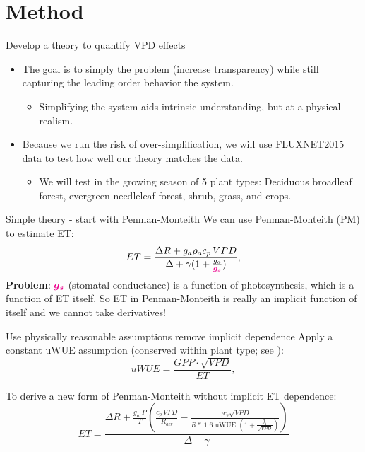 \documentclass[aspectratio=169]{beamer}
\begin{document}
\section{Method}
\begin{frame}{Develop a theory to quantify VPD effects}
  \begin{itemize}
  \item The goal is to simply the problem (increase transparency) while still capturing the leading order behavior the system.
    \begin{itemize}
    \item Simplifying the system aids intrinsic understanding, but at a physical realism.
    \end{itemize}
  \item Because we run the risk of over-simplification, we will use FLUXNET2015 data to test how well our theory matches the data.
    \begin{itemize}
    \item We will test in the growing season of 5 plant types: Deciduous broadleaf forest, evergreen needleleaf forest, shrub, grass, and crops.
    \end{itemize}
  \end{itemize}
\end{frame}

\begin{frame}{Simple theory - start with Penman-Monteith}
  We can use Penman-Monteith (PM) to estimate ET:
  \[ET = \frac{\Delta R + g_a \rho_a c_p \, VPD}{\Delta + \gamma(1 + \frac{g_a}{\textcolor{magenta}{\boldsymbol{g_s}}})},\]
    \textbf{Problem}: \Large $\textcolor{magenta}{\boldsymbol{g_s}}$ \normalsize (stomatal conductance) is a function of photosynthesis, which is a function of ET itself.  So ET in Penman-Monteith is really an implicit function of itself and we cannot take derivatives!
\end{frame}

\begin{frame}{Use physically reasonable assumptions remove implicit dependence}
  Apply a constant uWUE assumption (conserved within plant type; see \cite{Zhou_2016}):
  \[uWUE = \frac{GPP \cdot \sqrt{VPD}}{ET},\]
  \begin{overprint}
    To derive a new form of Penman-Monteith without implicit ET dependence:
    \[  ET = \frac{\Delta R + \frac{g_a\; P}{T} \left( \frac{ c_p \, VPD}{R_{air}} -  \frac{\gamma c_s \sqrt{VPD} }{ R* \; 1.6 \text{ uWUE } (1 + \frac{g_1}{\sqrt{VPD}})} \right)}{ \Delta + \gamma}\]
    \end{overprint}
\end{frame}
\end{document}

